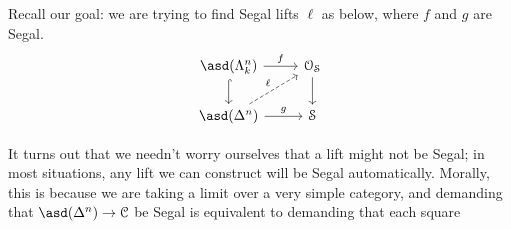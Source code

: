 \documentclass[main.tex]{subfiles}
\begin{document}
Recall our goal: we are trying to find Segal lifts $\ell$ as below, where $f$ and $g$ are Segal.
\begin{equation}
  \label{eq:lifting_problem_for_spans}
  \begin{tikzcd}
    \asd(\Lambda^{n}_{k})
    \arrow[r, "f"]
    \arrow[d, hook]
    & \OS
    \arrow[d]
    \\
    \asd(\Delta^{n})
    \arrow[r, "g"]
    \arrow[ur, dashed, "\ell"]
    & \S
  \end{tikzcd}
\end{equation}

It turns out that we needn't worry ourselves that a lift might not be Segal; in most situations, any lift we can construct will be Segal automatically. Morally, this is because we are taking a limit over a very simple category, and demanding that $\asd(\Delta^{n}) \to \category{C}$ be Segal is equivalent to demanding that each square
\end{document}
